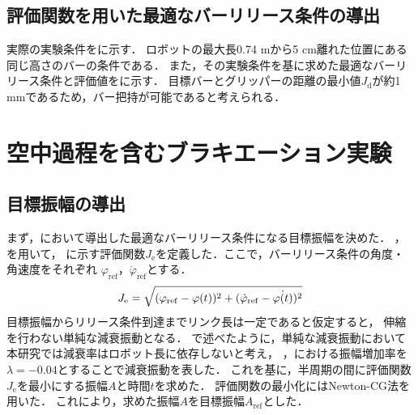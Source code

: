           
        
        \subsection{評価関数を用いた最適なバーリリース条件の導出}
        実際の実験条件をに示す．
        ロボットの最大長0.74 mから5 cm離れた位置にある同じ高さのバーの条件である．
        また，その実験条件を基に求めた最適なバーリリース条件と評価値をに示す．
        目標バーとグリッパーの距離の最小値$J_{\mathrm{d}}$が約1 mmであるため，バー把持が可能であると考えられる．
        

        \section{空中過程を含むブラキエーション実験}
        \subsection{目標振幅の導出}
        
          まず，において導出した最適なバーリリース条件になる目標振幅を決めた．
          ，を用いて，
          に示す評価関数$J_{\mathrm{e}}$を定義した．ここで，バーリリース条件の角度・角速度をそれぞれ
          $\varphi_{\mathrm{ref}}$，$\dot{\varphi}_{\mathrm{ref}}$とする．
          \begin{eqnarray}
            \equlabel{error}
            J_{\mathrm{e}}=\sqrt{(\varphi_{\mathrm{ref}}-\varphi(t))^2+(\dot{\varphi}_{\mathrm{ref}}-\dot{\varphi(t)})^2}
          \end{eqnarray}
          目標振幅からリリース条件到達までリンク長は一定であると仮定すると，
          伸縮を行わない単純な減衰振動となる．
          で述べたように，単純な減衰振動において本研究では減衰率はロボット長に依存しないと考え，
          ，における振幅増加率を
          $\lambda=-0.04$とすることで減衰振動を表した．
          これを基に，半周期の間に評価関数$J_{\mathrm{e}}$を最小にする振幅$A$と時間$t$を求めた．
          評価関数の最小化にはNewton-CG法を用いた．
          これにより，求めた振幅$A$を目標振幅$A_{\mathrm{ref}}$とした．
          
